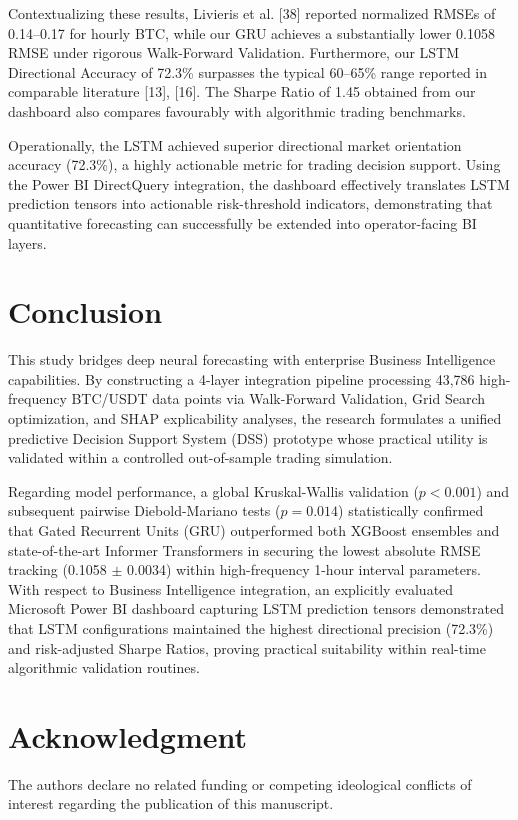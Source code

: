 \documentclass[10pt,a4paper]{article}
\begin{document}
Contextualizing these results, Livieris et al. [38] reported normalized RMSEs of 0.14--0.17 for hourly BTC, while our GRU achieves a substantially lower 0.1058 RMSE under rigorous Walk-Forward Validation. Furthermore, our LSTM Directional Accuracy of 72.3\% surpasses the typical 60--65\% range reported in comparable literature [13], [16]. The Sharpe Ratio of 1.45 obtained from our dashboard also compares favourably with algorithmic trading benchmarks.

Operationally, the LSTM achieved superior directional market orientation accuracy (72.3\%), a highly actionable metric for trading decision support. Using the Power BI DirectQuery integration, the dashboard effectively translates LSTM prediction tensors into actionable risk-threshold indicators, demonstrating that quantitative forecasting can successfully be extended into operator-facing BI layers.

\section{Conclusion}
This study bridges deep neural forecasting with enterprise Business Intelligence capabilities. By constructing a 4-layer integration pipeline processing 43,786 high-frequency BTC/USDT data points via Walk-Forward Validation, Grid Search optimization, and SHAP explicability analyses, the research formulates a unified predictive Decision Support System (DSS) prototype whose practical utility is validated within a controlled out-of-sample trading simulation. 

Regarding model performance, a global Kruskal-Wallis validation ($p < 0.001$) and subsequent pairwise Diebold-Mariano tests ($p = 0.014$) statistically confirmed that Gated Recurrent Units (GRU) outperformed both XGBoost ensembles and state-of-the-art Informer Transformers in securing the lowest absolute RMSE tracking (0.1058 $\pm$ 0.0034) within high-frequency 1-hour interval parameters. With respect to Business Intelligence integration, an explicitly evaluated Microsoft Power BI dashboard capturing LSTM prediction tensors demonstrated that LSTM configurations maintained the highest directional precision (72.3\%) and risk-adjusted Sharpe Ratios, proving practical suitability within real-time algorithmic validation routines. 

\section*{Acknowledgment}
The authors declare no related funding or competing ideological conflicts of interest regarding the publication of this manuscript.
\end{document}
